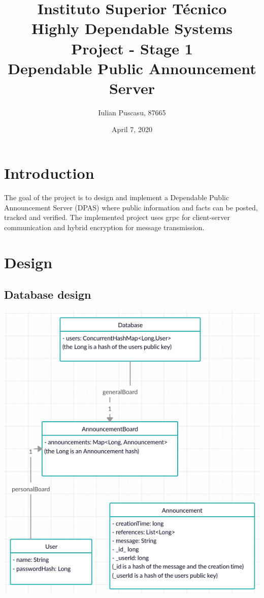 \documentclass[10pt,twocolumn]{article}
\begin{document}
\setlength{\droptitle}{-4em}     %
\addtolength{\droptitle}{-20pt}   %

\title{%
Instituto Superior Técnico \\
\huge Highly Dependable Systems Project - Stage 1 \\
\huge Dependable Public Announcement Server
}

\author{Iulian Puscasu, 87665}

\date{April 7, 2020}

\maketitle

\section{Introduction }
The goal of the project is to design and implement a Dependable Public Announcement Server (DPAS) where public information and facts can be posted, tracked and verified.
The implemented project uses grpc for client-server communication and hybrid encryption for message transmission.

\section{Design}

\subsection{Database design}

\includegraphics[scale=0.375]{database-domain}
\end{document}
